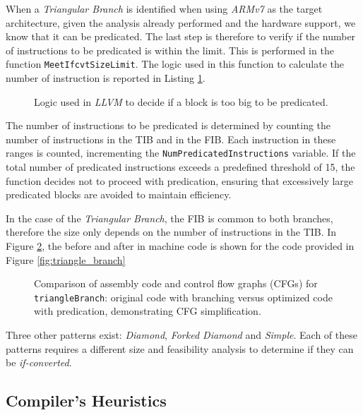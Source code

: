When a \textit{Triangular Branch} is identified when using \textit{ARMv7} as the target architecture, given the analysis already performed and the hardware support, we know that it can be predicated. The last step is therefore to verify if the number of instructions to be predicated is within the limit. This is performed in the function \texttt{MeetIfcvtSizeLimit}. The logic used in this function to calculate the number of instruction is reported in Listing \ref{fig:predication_size}.

\begin{figure}[H]
    \centering
    
    \caption{Logic used in \textit{LLVM} to decide if a block is too big to be predicated.}
    \label{fig:predication_size}
\end{figure}

The number of instructions to be predicated is determined by counting the number of instructions in the TIB and in the FIB. Each instruction in these ranges is counted, incrementing the \texttt{NumPredicatedInstructions} variable. If the total number of predicated instructions exceeds a predefined threshold of 15, the function decides not to proceed with predication, ensuring that excessively large predicated blocks are avoided to maintain efficiency.

In the case of the \textit{Triangular Branch}, the FIB is common to both branches, therefore the size only depends on the number of instructions in the TIB. In Figure \ref{fig:triangle_asm}, the before and after in machine code is shown for the code provided in Figure \ref{fig:triangle_branch}

\begin{figure}[H]
    \centering
    
    \caption[TriangleBranch Comparison]{Comparison of assembly code and control flow graphs (CFGs) for \texttt{triangleBranch}: original code with branching versus optimized code with predication, demonstrating CFG simplification.}
    \label{fig:triangle_asm}
\end{figure}


Three other patterns exist: \textit{Diamond}, \textit{Forked Diamond} and \textit{Simple}. Each of these patterns requires a different size and feasibility analysis to determine if they can be \textit{if-converted}.

\subsection{Compiler's Heuristics}
\label{sec:compiler_heuristics}

